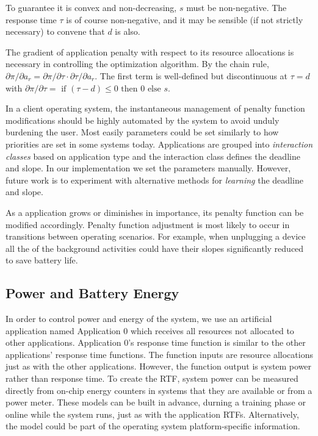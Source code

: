 To guarantee it is convex and non-decreasing, $s$ must be non-negative.
The response time $\tau$  is of course non-negative, and it may be sensible (if not strictly necessary) to convene that $d$ is also.

The gradient of application penalty with respect to its resource allocations is necessary in controlling the optimization algorithm.
By the chain rule, $\partial\pi/\partial a_r = \partial\pi/\partial\tau\cdot\partial\tau/\partial a_r$.
The first term is well-defined but discontinuous at $\tau = d$ with
$\partial\pi/\partial\tau = \mbox{ if } (\tau - d) \leq 0 \mbox{ then } 0 \mbox{ else } s$.

In a client operating system, the instantaneous management of penalty function modifications should be highly automated by the system to avoid unduly burdening the user. Most easily parameters could be set similarly to how priorities are set in some systems today. Applications are grouped into \emph{interaction classes} based on application type and the interaction class defines the deadline and slope.  In our implementation we set the parameters manually. However, future work is to experiment with alternative methods for \emph{learning} the deadline and slope.

As a application grows or diminishes in importance, its penalty function can be modified accordingly.  Penalty function adjustment is most likely to occur in transitions between operating scenarios.  For example, when unplugging a device all the of the background activities could have their slopes significantly reduced to save battery life.

\subsection*{Power and Battery Energy}
In order to control power and energy of the system, we use an artificial application named Application 0 which receives all resources not allocated to other applications. Application 0's response time function is similar to the other applications' response time functions.  The function inputs are resource allocations just as with the other applications.  However, the function output is system power rather than response time.   To create the RTF, system power can be measured directly from on-chip energy counters in systems that they are available or from a power meter.  These models can be built in advance, durning a training phase or online while the system runs, just as with the application RTFs.  Alternatively, the model could be part of the operating system platform-specific information.

